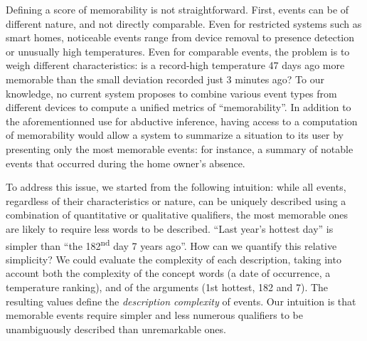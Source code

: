 \documentclass[entropy,article,submit,moreauthors,pdftex]{Definitions/mdpi}
\begin{document}
Defining a score of memorability is not straightforward. First, events can be of different nature, and not directly
comparable. Even for restricted systems such as smart homes, noticeable events
range from device removal to presence detection or unusually high
temperatures. Even for comparable events, the problem is to weigh different characteristics: is a record-high temperature 47 days
ago more memorable than the small deviation recorded just 3 minutes ago? To
our knowledge, no current system proposes to combine various
event types from different devices to compute a unified metrics of
``memorability''. 
In addition to the aforementionned use for abductive inference, having access to a computation of memorability would allow a system to summarize a situation to its user by presenting only the most memorable events: for instance, a summary of notable events that occurred during the home owner's absence.

To address this issue, we started from the following intuition: while all
events, regardless of their characteristics or nature, can be uniquely
described using a combination of quantitative or qualitative qualifiers, the most memorable ones are
likely to require less words to be described. ``Last year's hottest day'' is simpler than ``the 182\textsuperscript{nd} day 7 years ago''. How can we quantify this relative simplicity? We could evaluate the complexity of each
description, taking into account both the complexity of the concept words (a date
of occurrence, a temperature ranking), and of the arguments (1st hottest,
182 and 7). The resulting values define the  \emph{description complexity}
of events. Our intuition is that memorable events require simpler and less numerous qualifiers to be
unambiguously described than unremarkable ones.
\end{document}
